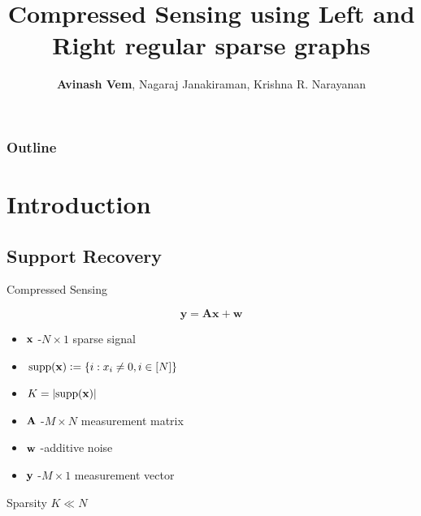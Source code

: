 \documentclass[10pt]{beamer}
\begin{document}
\title{\bf Compressed Sensing using Left and Right regular sparse graphs}
\author{\textbf{Avinash Vem}, Nagaraj Janakiraman, Krishna R. Narayanan} 
\vspace{10pt}


\date{} %
\frame{\titlepage}

\begin{frame}
	\frametitle{Outline}
	\tableofcontents
\end{frame}

\section{Introduction}
\subsection{Support Recovery}
\begin{frame}{Compressed Sensing}
\begin{block}{}
\begin{equation*}
\mathbf{y=Ax +w}
\end{equation*}
\end{block}

\begin{itemize}
\item $\mathbf{x}$ -$N \times 1$ sparse signal
\item $\text{supp}(\mathbf{x})\mathrel{\mathop:}= \{i: x_i\neq 0, i\in [N]\}$
\item $K=\lvert{\text{supp}(\mathbf{x})}\rvert$
\item $\mathbf{A}$ -$M \times N$ measurement matrix
\item $\mathbf{w}$ -additive noise
\item $\mathbf{y}$ -$M \times 1$ measurement vector
\end{itemize}

\begin{block}{Sparsity}
 $K\ll N$ 
\end{block}
\end{frame}
\end{document}
